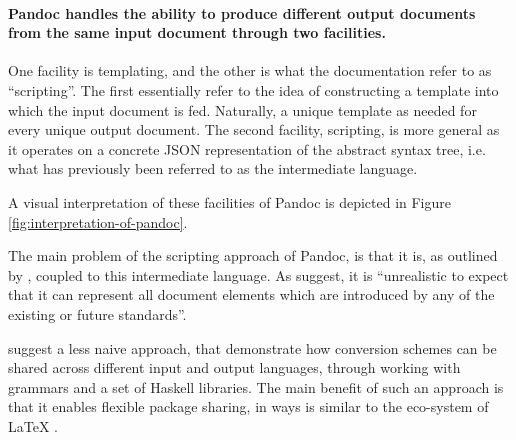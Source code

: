 \documentclass{scrreprt}
\begin{document}
\paragraph{Pandoc\footnotePandoc{} handles the ability to produce different output documents from the same input document through two facilities.} One facility is templating, and the other is what the documentation refer to as ``scripting''\footnotePandoc{}. The first essentially refer to the idea of constructing a template into which the input document is fed. Naturally, a unique template as needed for every unique output document. The second facility, scripting, is more general as it operates on a concrete JSON representation of the abstract syntax tree, i.e. what has previously been referred to as the intermediate language.

A visual interpretation of these facilities of Pandoc\footnotePandoc{} is depicted in Figure \ref{fig:interpretation-of-pandoc}.

The main problem of the scripting approach of Pandoc\footnotePandoc{}, is that it is, as outlined by \citet{krijnen}, coupled to this intermediate language. As \citet{krijnen} suggest, it is ``unrealistic to expect that it can represent all document elements which are introduced by any of the existing or future standards''.

\citet{krijnen} suggest a less naive approach, that demonstrate how conversion schemes can be shared across different input and output languages, through working with grammars and a set of Haskell libraries. The main benefit of such an approach is that it enables flexible package sharing, in ways is similar to the eco-system of \LaTeX{} \citep{krijnen}.
\end{document}
